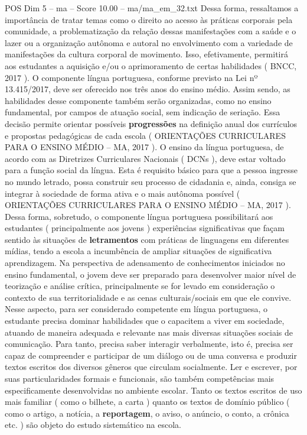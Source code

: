 \begin{textsample}{POS Dim 5 – ma – Score 10.00 – ma/ma\_em\_32.txt}
Dessa forma, ressaltamos a importância de tratar temas como o direito ao acesso às práticas corporais pela comunidade, a problematização da relação dessas manifestações com a saúde e o lazer ou a organização autônoma e autoral no envolvimento com a variedade de manifestações da cultura corporal de movimento.
Isso, efetivamente, permitirá aos estudantes a aquisição e/ou o aprimoramento de certas habilidades ( BNCC, 2017 ).
O componente língua portuguesa, conforme previsto na Lei nº 13.415/2017, deve ser oferecido nos três anos do ensino médio.
Assim sendo, as habilidades desse componente também serão organizadas, como no ensino fundamental, por campos de atuação social, sem indicação de seriação.
Essa decisão permite orientar possíveis \textbf{progressões} na definição anual dos currículos e propostas pedagógicas de cada escola ( ORIENTAÇÕES CURRICULARES PARA O ENSINO MÉDIO – MA, 2017 ).
O ensino da língua portuguesa, de acordo com as Diretrizes Curriculares Nacionais ( DCNs ), deve estar voltado para a função social da língua.
Esta é requisito básico para que a pessoa ingresse no mundo letrado, possa construir seu processo de cidadania e, ainda, consiga se integrar à sociedade de forma ativa e o mais autônoma possível ( ORIENTAÇÕES CURRICULARES PARA O ENSINO MÉDIO – MA, 2017 ).
Dessa forma, sobretudo, o componente língua portuguesa possibilitará aos estudantes ( principalmente aos jovens ) experiências significativas que façam sentido às situações de \textbf{letramentos} com práticas de linguagens em diferentes mídias, tendo a escola a incumbência de ampliar situações de significativa aprendizagem.
Na perspectiva de adensamento de conhecimentos iniciados no ensino fundamental, o jovem deve ser preparado para desenvolver maior nível de teorização e análise crítica, principalmente se for levado em consideração o contexto de sua territorialidade e as cenas culturais/sociais em que ele convive.
Nesse aspecto, para ser considerado competente em língua portuguesa, o estudante precisa dominar habilidades que o capacitem a viver em sociedade, atuando de maneira adequada e relevante nas mais diversas situações sociais de comunicação.
Para tanto, precisa saber interagir verbalmente, isto é, precisa ser capaz de compreender e participar de um diálogo ou de uma conversa e produzir textos escritos dos diversos gêneros que circulam socialmente.
Ler e escrever, por suas particularidades formais e funcionais, são também competências mais especificamente desenvolvidas no ambiente escolar.
Tanto os textos escritos de uso mais familiar ( como o bilhete, a carta ) quanto os textos de domínio público ( como o artigo, a notícia, a \textbf{reportagem}, o aviso, o anúncio, o conto, a crônica etc. ) são objeto do estudo sistemático na escola.

\end{textsample}
